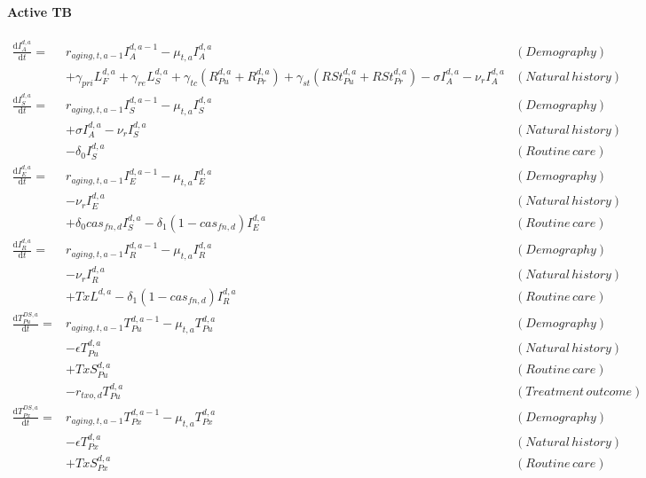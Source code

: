 \paragraph{Active TB}
\begin{align*}
\frac{\mathrm{d}I_A^{d, a}}{\mathrm{d}t} =& r_{aging, t, a-1} I_A^{d, a - 1} - \mu_{t, a} I_A^{d, a} & (Demography)\\
  &+ \gamma_{pri} L_F^{d, a} + \gamma_{re} L_S^{d, a} + \gamma_{tc} (R_{Pu}^{d, a} + R_{Pr}^{d, a}) + \gamma_{st} (RSt_{Pu}^{d, a} + RSt_{Pr}^{d, a}) - \sigma I_A^{d, a} - \nu_{r} I_A^{d, a} & (Natural\,history)\\
\frac{\mathrm{d}I_S^{d, a}}{\mathrm{d}t} =& r_{aging, t, a-1} I_S^{d, a - 1} - \mu_{t, a} I_S^{d, a} & (Demography)\\
  &+ \sigma I_A^{d, a} - \nu_{r} I_S^{d, a} & (Natural\,history)\\
  &- \delta_0 I_S^{d, a} & (Routine\,care)\\
\frac{\mathrm{d}I_E^{d, a}}{\mathrm{d}t} =& r_{aging, t, a-1} I_E^{d, a - 1} - \mu_{t, a} I_E^{d, a} & (Demography)\\
  &- \nu_{r} I_E^{d, a} & (Natural\,history)\\
  &+ \delta_0 cas_{fn, d} I_S^{d, a} - \delta_1 (1 - cas_{fn, d}) I_E^{d, a} & (Routine\,care)\\
\frac{\mathrm{d}I_R^{d, a}}{\mathrm{d}t} =& r_{aging, t, a-1} I_R^{d, a - 1} - \mu_{t, a} I_R^{d, a} & (Demography)\\
  &- \nu_{r} I_R^{d, a} & (Natural\,history)\\
  &+ TxL^{d, a} - \delta_1 (1 - cas_{fn, d}) I_R^{d, a} & (Routine\,care)\\
\frac{\mathrm{d}T_{Pu}^{DS, a}}{\mathrm{d}t} =& r_{aging, t, a-1} T_{Pu}^{d, a - 1} - \mu_{t, a} T_{Pu}^{d, a} & (Demography)\\
  &- \epsilon T_{Pu}^{d, a} & (Natural\,history)\\
  &+ TxS_{Pu}^{d, a} & (Routine\,care)\\
  &- r_{txo, d} T_{Pu}^{d, a} & (Treatment\,outcome)\\
\frac{\mathrm{d}T_{Px}^{DS, a}}{\mathrm{d}t} =& r_{aging, t, a-1} T_{Px}^{d, a - 1} - \mu_{t, a} T_{Px}^{d, a} & (Demography)\\
  &- \epsilon T_{Px}^{d, a} & (Natural\,history)\\
  &+ TxS_{Px}^{d, a} & (Routine\,care)\\

\end{align*}
